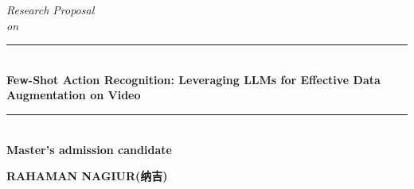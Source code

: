 \documentclass[12pt]{article}
\newcommand{\HRule}{\rule{\linewidth}{1mm}}
\begin{document}
\begin{titlepage}
\begin{center}
    \vspace*{2cm}

    \textit{ Research Proposal \\on}

    \HRule \\[0.3cm]
    { \large \bfseries Few-Shot Action Recognition: Leveraging LLMs for Effective Data Augmentation on Video}\\[0.1cm] 
    \HRule \\[0.3cm]


    \large{ \bfseries Master's admission candidate}
    \vspace*{7cm}
    

    \begin{CJK*}{UTF8}{gbsn}
        \large{ \bfseries RAHAMAN NAGIUR(纳吉)}
    \end{CJK*}

    
\end{center}
\end{titlepage}


\newpage









   




\printbibliography
\end{document}
